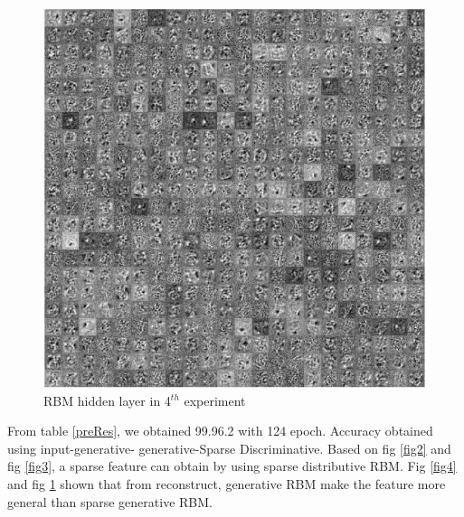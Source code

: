 \documentclass[conference]{IEEEtran}
\begin{document}
\begin{figure}[h]
	\centering
	\includegraphics[width=.25\textwidth]{pics/fig5.jpg}
	\caption{RBM hidden layer in 4$^{th}$ experiment}
	\label{fig5}
\end{figure}

From  table \ref{preRes}, we obtained 99.96.2%
with 124 epoch. Accuracy obtained using input-generative-
generative-Sparse Discriminative. Based on fig \ref{fig2} and fig \ref{fig3},
a sparse feature can obtain by using sparse distributive RBM.
Fig \ref{fig4} and fig \ref{fig5} shown that from reconstruct, generative RBM
make the feature more general than sparse generative RBM.
\end{document}
